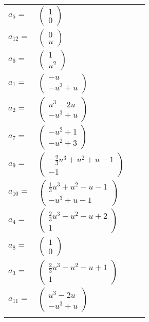 \documentclass[1p]{elsarticle_modified}
\theoremstyle{definition}
\begin{document}
\begin{tabular}{m{7pt} m{180pt} m{7pt} m{180pt} }
\flushright $a_{5}=$&$\begin{pmatrix}1\\0\end{pmatrix}$ \\
\flushright $a_{12}=$&$\begin{pmatrix}0\\u\end{pmatrix}$ \\
\flushright $a_{6}=$&$\begin{pmatrix}1\\u^2\end{pmatrix}$ \\
\flushright $a_{1}=$&$\begin{pmatrix}- u\\- u^3+u\end{pmatrix}$ \\
\flushright $a_{2}=$&$\begin{pmatrix}u^3-2 u\\- u^3+u\end{pmatrix}$ \\
\flushright $a_{7}=$&$\begin{pmatrix}- u^2+1\\- u^2+3\end{pmatrix}$ \\
\flushright $a_{9}=$&$\begin{pmatrix}-\frac{2}{3} u^3+u^2+u-1\\-1\end{pmatrix}$ \\
\flushright $a_{10}=$&$\begin{pmatrix}\frac{1}{3} u^3+u^2- u-1\\- u^3+u-1\end{pmatrix}$ \\
\flushright $a_{4}=$&$\begin{pmatrix}\frac{2}{3} u^3- u^2- u+2\\1\end{pmatrix}$ \\
\flushright $a_{8}=$&$\begin{pmatrix}1\\0\end{pmatrix}$ \\
\flushright $a_{3}=$&$\begin{pmatrix}\frac{2}{3} u^3- u^2- u+1\\1\end{pmatrix}$ \\
\flushright $a_{11}=$&$\begin{pmatrix}u^3-2 u\\- u^3+u\end{pmatrix}$\\&\end{tabular}
\end{document}
